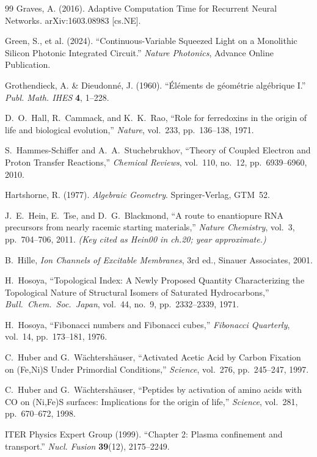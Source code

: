 \documentclass[12pt,oneside]{book}
\theoremstyle{principia}
\theoremstyle{definition}
\theoremstyle{remark}
\begin{document}
\begin{thebibliography}{99}
Graves, A. (2016).
Adaptive Computation Time for Recurrent Neural Networks.
arXiv:1603.08983 [cs.NE].

Green, S., et al. (2024).
``Continuous-Variable Squeezed Light on a Monolithic Silicon Photonic Integrated Circuit.''
\textit{Nature Photonics}, Advance Online Publication.

Grothendieck, A. \& Dieudonn\'e, J. (1960).
``\'El\'ements de g\'eom\'etrie alg\'ebrique I.''
\textit{Publ. Math. IHES} \textbf{4}, 1--228.

D.~O.~Hall, R.~Cammack, and K.~K.~Rao,
``Role for ferredoxins in the origin of life and biological evolution,''
\emph{Nature}, vol.~233, pp.~136--138, 1971.

S.~Hammes-Schiffer and A.~A.~Stuchebrukhov,
``Theory of Coupled Electron and Proton Transfer Reactions,''
\emph{Chemical Reviews}, vol.~110, no.~12, pp.~6939--6960, 2010.

Hartshorne, R. (1977).
\textit{Algebraic Geometry}. Springer-Verlag, GTM~52.

J.~E.~Hein, E.~Tse, and D.~G.~Blackmond,
``A route to enantiopure RNA precursors from nearly racemic starting materials,''
\emph{Nature Chemistry}, vol.~3, pp.~704--706, 2011.
\textit{(Key cited as Hein00 in ch.20; year approximate.)}

B.~Hille,
\emph{Ion Channels of Excitable Membranes},
3rd ed., Sinauer Associates, 2001.

H.~Hosoya,
``Topological Index: A Newly Proposed Quantity Characterizing the Topological Nature of Structural Isomers of Saturated Hydrocarbons,''
\emph{Bull.\ Chem.\ Soc.\ Japan}, vol.~44, no.~9, pp.~2332--2339, 1971.

H.~Hosoya,
``Fibonacci numbers and Fibonacci cubes,''
\emph{Fibonacci Quarterly}, vol.~14, pp.~173--181, 1976.

C.~Huber and G.~W\"achtersh\"auser,
``Activated Acetic Acid by Carbon Fixation on (Fe,Ni)S Under Primordial Conditions,''
\emph{Science}, vol.~276, pp.~245--247, 1997.

C.~Huber and G.~W\"achtersh\"auser,
``Peptides by activation of amino acids with CO on (Ni,Fe)S surfaces:
Implications for the origin of life,''
\emph{Science}, vol.~281, pp.~670--672, 1998.

ITER Physics Expert Group (1999).
``Chapter 2: Plasma confinement and transport.''
\textit{Nucl. Fusion} \textbf{39}(12), 2175--2249.


\end{thebibliography}
\end{document}
